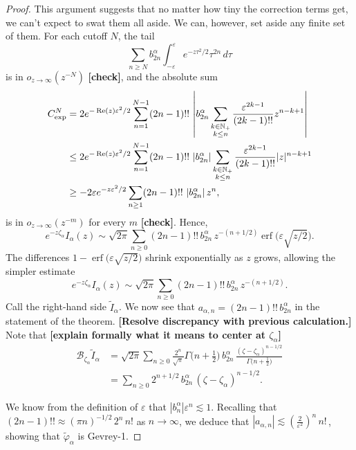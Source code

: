 \documentclass[11pt,a4paper,twoside,leqno,noamsfonts]{amsart}
\numberwithin{equation}{section}
\begin{document}
\begin{proof}
This argument suggests that no matter how tiny the correction terms get, we can't expect to swat them all aside. We can, however, set aside any finite set of them. For each cutoff $N$, the tail
\[ \sum_{n \ge N} b_{2n}^\alpha \int_{-\varepsilon}^\varepsilon e^{-z\tau^2/2} \tau^{2n}\,d\tau \]
is in $o_{z \to \infty}(z^{-N})$ \textbf{[check]}, and the absolute sum
\begin{align*}
C_\text{exp}^N & = 2e^{-\operatorname{Re}(z)\varepsilon^2/2} \sum_{n = 1}^{N-1} (2n-1)!!\,\left| b_{2n}^\alpha \sum_{\substack{k \in \mathbb N_+ \\ k \le n}} \frac{\varepsilon^{2k-1}}{(2k-1)!!} z^{n-k+1} \right| \\
& \le 2e^{-\operatorname{Re}(z)\varepsilon^2/2} \sum_{n = 1}^{N-1} (2n-1)!!\,\left|b_{2n}^\alpha\right| \sum_{\substack{k \in \mathbb N_+ \\ k \le n}} \frac{\varepsilon^{2k-1}}{(2k-1)!!} |z|^{n-k+1} \\
& \ge -2\varepsilon e^{-z\varepsilon^2/2} \sum_{n \ge 1} (2n-1)!!\,\left|b_{2n}^\alpha\right| z^n,
\end{align*}
is in $o_{z \to \infty}(z^{-m})$ for every $m$ \textbf{[check]}. Hence,
\[ e^{-z\zeta_\alpha} I_\alpha(z) \sim \sqrt{2\pi} \sum_{n \ge 0} (2n-1)!!\,b_{2n}^\alpha\,z^{-(n+1/2)} \operatorname{erf}\big(\varepsilon \sqrt{z/2}\big). \]
The differences $1 - \operatorname{erf}\big(\varepsilon \sqrt{z/2}\big)$ shrink exponentially as $z$ grows, allowing the simpler estimate
\[ e^{-z\zeta_\alpha} I_\alpha(z) \sim \sqrt{2\pi} \sum_{n \ge 0} (2n-1)!!\,b_{2n}^\alpha\,z^{-(n+1/2)}. \]
Call the right-hand side $\tilde{I}_\alpha$. We now see that $a_{\alpha,n} = (2n-1)!!\,b_{2n}^\alpha$ in the statement of the theorem. \textbf{[Resolve discrepancy with previous calculation.]} Note that \textbf{[explain formally what it means to center at $\zeta_\alpha$]}
\begin{align*}
\mathcal{B}_{\zeta_\alpha} \tilde{I}_\alpha & = \sqrt{2\pi} \sum_{n \ge 0} \frac{2^n}{\sqrt{\pi}} \Gamma\big(n+\tfrac{1}{2}\big)\,b_{2n}^\alpha\,\frac{(\zeta - \zeta_\alpha)^{n-1/2}}{\Gamma\big(n+\tfrac{1}{2}\big)} \\
& = \sum_{n \ge 0} 2^{n+1/2}\,b_{2n}^\alpha\,(\zeta - \zeta_\alpha)^{n-1/2}.
\end{align*}

We know from the definition of $\varepsilon$ that $\left|b_n^\alpha\right| \varepsilon^n \lesssim 1$. Recalling that $(2n - 1)!! \approx (\pi n)^{-1/2}\,2^n\,n!$ as $n \to \infty$, we deduce that $|a_{\alpha,n}| \lesssim \left(\tfrac{2}{\varepsilon^2}\right)^n\,n!\,$, showing that $\tilde{\varphi}_\alpha$ is Gevrey-1.


\end{proof}
\end{document}
